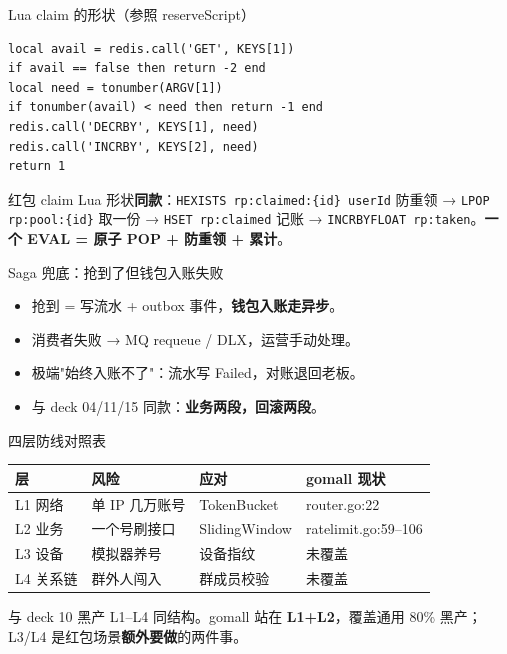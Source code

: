 \begin{frame}[fragile]{Lua claim 的形状（参照 reserveScript）}
\begin{lstlisting}[language=LuaRedis,firstnumber=32]
local avail = redis.call('GET', KEYS[1])
if avail == false then return -2 end
local need = tonumber(ARGV[1])
if tonumber(avail) < need then return -1 end
redis.call('DECRBY', KEYS[1], need)
redis.call('INCRBY', KEYS[2], need)
return 1
\end{lstlisting}
\small 红包 claim Lua 形状\textbf{同款}：\texttt{HEXISTS rp:claimed:\{id\} userId} 防重领 → \texttt{LPOP rp:pool:\{id\}} 取一份 → \texttt{HSET rp:claimed} 记账 → \texttt{INCRBYFLOAT rp:taken}。\textbf{一个 EVAL = 原子 POP + 防重领 + 累计}。
\end{frame}

\begin{frame}{Saga 兜底：抢到了但钱包入账失败}
\vspace{1mm}
\begin{itemize}
  \item 抢到 = 写流水 + outbox 事件，\textbf{钱包入账走异步}。
  \item 消费者失败 → MQ requeue / DLX，运营手动处理。
  \item 极端"始终入账不了"：流水写 Failed，对账退回老板。
  \item 与 deck 04/11/15 同款：\textbf{业务两段，回滚两段}。
\end{itemize}
\end{frame}

\begin{frame}{四层防线对照表}
{\small
\begin{tabular}{@{}llll@{}}
\toprule
层 & 风险 & 应对 & gomall 现状 \\
\midrule
L1 网络   & 单 IP 几万账号 & TokenBucket    & router.go:22 \\
L2 业务   & 一个号刷接口   & SlidingWindow  & ratelimit.go:59--106 \\
L3 设备   & 模拟器养号     & 设备指纹       & 未覆盖 \\
L4 关系链 & 群外人闯入     & 群成员校验     & 未覆盖 \\
\bottomrule
\end{tabular}
}
\vspace{2mm}
\small 与 deck 10 黑产 L1--L4 同结构。gomall 站在 \textbf{L1+L2}，覆盖通用 80\% 黑产；L3/L4 是红包场景\textbf{额外要做}的两件事。
\end{frame}

